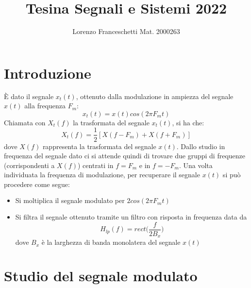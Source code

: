 \documentclass[12pt]{article}
\title{Tesina Segnali e Sistemi 2022}
\author{Lorenzo Franceschetti Mat. 2000263}
\date{}
\begin{document}
\maketitle

\section{Introduzione}

È dato il segnale $x_{t}(t)$, ottenuto dalla modulazione in ampiezza del segnale $x(t)$ alla frequenza $F_{m}$: 
\begin{equation}
	x_{t}(t) = x(t) cos(2\pi F_{m}t)
\end{equation} 
Chiamata con $X_{t}(f)$ la trasformata del segnale $x_{t}(t)$, si ha che: 
\begin{equation}
	X_{t}(f) = \frac{1}{2}[X(f - F_{m}) + X(f + F_{m})]
\end{equation}
dove $X(f)$ rappresenta la trasformata del segnale $x(t)$. Dallo studio in frequenza del segnale dato ci si attende quindi di trovare due gruppi di frequenze (corrispondenti a $X(f)$) centrati in $f = F_{m}$ e in $f = -F_{m}$. Una volta individuata la frequenza di modulazione, per recuperare il segnale $x(t)$ si può procedere come segue: 
\begin{itemize}
	\item Si moltiplica il segnale modulato per $2cos(2\pi F_{m}t)$
	\item Si filtra il segnale ottenuto tramite un filtro con risposta in frequenza data da
	\begin{equation}
		H_{lp}(f) = rect \biggl(\frac{f}{2B_{x}}\biggr)
	\end{equation}
	dove $B_{x}$ è la larghezza di banda monolatera del segnale $x(t)$
\end{itemize}

\section{Studio del segnale modulato}
\end{document}

